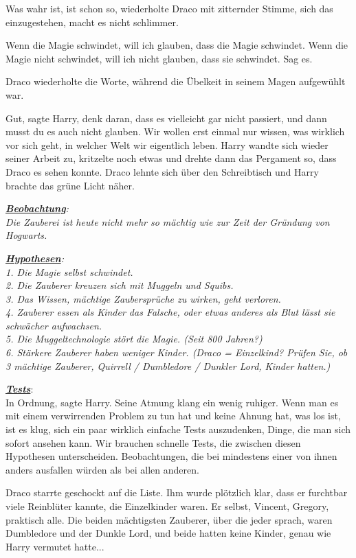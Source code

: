 \glqq{}Was wahr ist, ist schon so\grqq{}, wiederholte Draco mit zitternder
Stimme, \glqq{}sich das einzugestehen, macht es nicht schlimmer.\grqq{}

\glqq{}Wenn die Magie schwindet, will ich glauben, dass die Magie schwindet. Wenn
die Magie nicht schwindet, will ich nicht glauben, dass sie schwindet. Sag
es.\grqq{}

Draco wiederholte die Worte, während die Übelkeit in seinem Magen aufgewühlt
war.

\glqq{}Gut\grqq{}, sagte Harry, \glqq{}denk daran, dass es vielleicht gar nicht
passiert, und dann musst du es auch nicht glauben. Wir wollen erst einmal nur
wissen, was wirklich vor sich geht, in welcher Welt wir eigentlich leben.\grqq{}
Harry wandte sich wieder seiner Arbeit zu, kritzelte noch etwas und drehte dann
das Pergament so, dass Draco es sehen konnte. Draco lehnte sich über den
Schreibtisch und Harry brachte das grüne Licht näher.

\emph{\textbf{\underline{Beobachtung}}:\\
Die Zauberei ist heute nicht mehr so mächtig wie zur Zeit der Gründung von
Hogwarts.}

\emph{\textbf{\underline{Hypothesen}}:}\\
\emph{1. Die Magie selbst schwindet.\\
2. Die Zauberer kreuzen sich mit Muggeln und Squibs.\\
3. Das Wissen, mächtige Zaubersprüche zu wirken, geht verloren.\\
4. Zauberer essen als Kinder das Falsche, oder etwas anderes als Blut lässt sie
schwächer aufwachsen.\\
5. Die Muggeltechnologie stört die Magie. (Seit 800 Jahren?)\\
6. Stärkere Zauberer haben weniger Kinder. (Draco = Einzelkind? Prüfen Sie, ob 3
mächtige Zauberer, Quirrell / Dumbledore / Dunkler Lord, Kinder hatten.)}

\textbf{\emph{\underline{Tests}}}:\\
\glqq{}In Ordnung\grqq{}, sagte Harry. Seine Atmung klang ein wenig ruhiger.
\glqq{}Wenn man es mit einem verwirrenden Problem zu tun hat und keine Ahnung
hat, was los ist, ist es klug, sich ein paar wirklich einfache Tests
auszudenken, Dinge, die man sich sofort ansehen kann. Wir brauchen schnelle
Tests, die zwischen diesen Hypothesen unterscheiden. Beobachtungen, die bei
mindestens einer von ihnen anders ausfallen würden als bei allen anderen.\grqq{}

Draco starrte geschockt auf die Liste. Ihm wurde plötzlich klar, dass er
furchtbar viele Reinblüter kannte, die Einzelkinder waren. Er selbst, Vincent,
Gregory, praktisch alle. Die beiden mächtigsten Zauberer, über die jeder sprach,
waren Dumbledore und der Dunkle Lord, und beide hatten keine Kinder, genau wie
Harry vermutet hatte...

